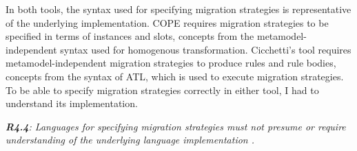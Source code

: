 \documentclass[a4paper]{article}
\begin{document}
In both tools, the syntax used for specifying migration strategies is representative of the underlying implementation. COPE requires migration strategies to be specified in terms of instances and slots, concepts from the metamodel-independent syntax used for homogenous transformation. Cicchetti's tool requires metamodel-independent migration strategies to produce rules and rule bodies, concepts from the syntax of ATL, which is used to execute migration strategies. To be able to specify migration strategies correctly in either tool, I had to understand its implementation.

\emph{\textbf{R4.4}: Languages for specifying migration strategies must not presume or require understanding of the underlying language implementation .}


% 
% 
% 


% 
% 
% 
\end{document}
